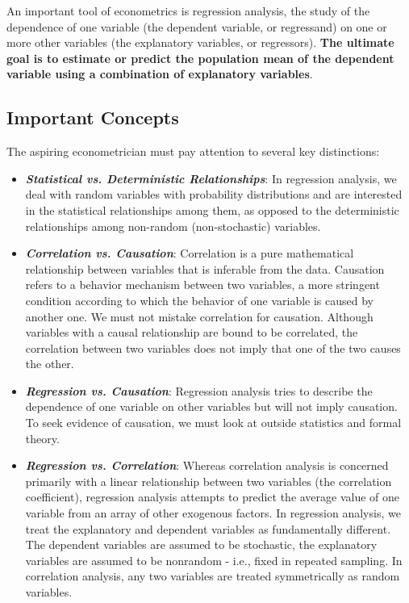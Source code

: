 An important tool of econometrics is regression analysis, the study of the dependence of one variable (the dependent variable, or regressand) on one or more other variables (the explanatory variables, or regressors). \textbf{The ultimate goal is to estimate or predict the population mean of the dependent variable using a combination of explanatory variables}.

\subsection{Important Concepts}
The aspiring econometrician must pay attention to several key distinctions:

\begin{itemize}
  \item \textbf{\textit{Statistical vs. Deterministic Relationships}}: In regression analysis, we deal with random variables with probability distributions and are interested in the statistical relationships among them, as opposed to the deterministic relationships among non-random (non-stochastic) variables.
  \item \textbf{\textit{Correlation vs. Causation}}: Correlation is a pure mathematical relationship between variables that is inferable from the data. Causation refers to a behavior mechanism between two variables, a more stringent condition according to which the behavior of one variable is caused by another one. We must not mistake correlation for causation. Although variables with a causal relationship are bound to be correlated, the correlation between two variables does not imply that one of the two causes the other.
  \item \textbf{\textit{Regression vs. Causation}}: Regression analysis tries to describe the dependence of one variable on other variables but will not imply causation. To seek evidence of causation, we must look at outside statistics and formal theory.
  \item \textbf{\textit{Regression vs. Correlation}}: Whereas correlation analysis is concerned primarily with a linear relationship between two variables (the correlation coefficient), regression analysis attempts to predict the average value of one variable from an array of other exogenous factors. In regression analysis, we treat the explanatory and dependent variables as fundamentally different. The dependent variables are assumed to be stochastic, the explanatory variables are assumed to be nonrandom - i.e., fixed in repeated sampling. In correlation analysis, any two variables are treated symmetrically as random variables.
\end{itemize}

